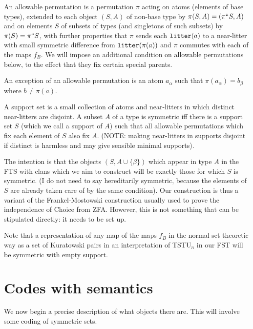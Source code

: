 \documentclass{article}
\begin{document}
An allowable permutation is a permutation $\pi$ acting on atoms (elements of base types), extended to each object $(S,A)$ of non-base type by $\pi(S,A)=(\pi``S,A)$ and on elements $S$ of subsets of types (and singletons of such subsets)
by $\pi(S)=\pi``S$, with further properties that $\pi$ sends each ${\tt litter}(a)$ to a near-litter with small symmetric difference from ${\tt litter}(\pi(a))$ and $\pi$ commutes with each of the maps $f_B$.  We will impose an additional condition on allowable permutations below, to the effect that they fix certain special parents.

An exception of an allowable permutation is an atom $a_{\alpha}$ such that $\pi(a_{\alpha})=b_{\beta}$ where $b \neq \pi(a)$.

A support set is a small collection of atoms and near-litters in which distinct near-litters are disjoint.  A subset $A$ of a type is symmetric iff there is a support set $S$ (which we call a support of $A$) such that all allowable permutations which
fix each element of $S$ also fix $A$.  (NOTE:  making near-litters in supports disjoint if distinct is harmless and may give sensible minimal supports).

The intention is that the objects $(S,A\cup \{\beta\})$ which appear in type $A$ in the FTS with clans which we aim to construct will be exactly those for which $S$ is symmetric.  (I do not need to say hereditarily symmetric, because the elements
of $S$ are already taken care of by the same condition).  Our construction is thus a variant of the Frankel-Mostowski construction usually used to prove the independence of Choice from ZFA.  However, this is not something that can be stipulated directly:  it needs to be set up.

Note that a representation of any map of the maps $f_B$ in the normal set theoretic way as a set of Kuratowski pairs in an interpretation of TSTU$_n$ in our FST will be symmetric with empty support.

\newpage

\section{Codes with semantics}

We now begin a precise description of what objects there are.   This will involve some coding of symmetric sets.  
\end{document}
